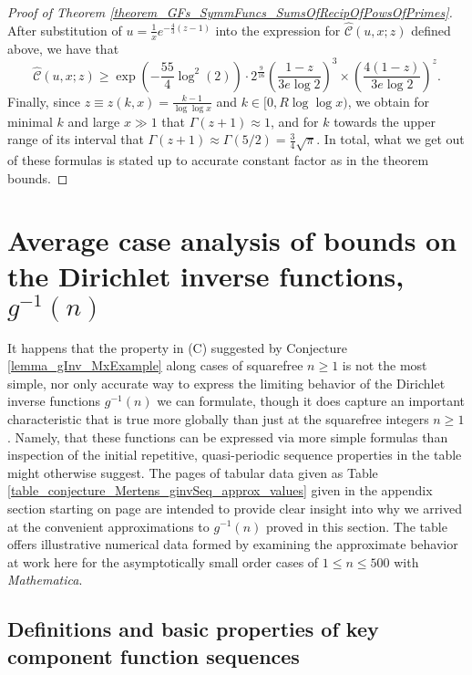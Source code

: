 \documentclass[11pt,reqno,a4letter]{article}
\numberwithin{figure}{section}
\numberwithin{table}{section}
\theoremstyle{plain}
\numberwithin{theorem}{section}
\theoremstyle{definition}
\begin{document}
\begin{proof}[Proof of Theorem \ref{theorem_GFs_SymmFuncs_SumsOfRecipOfPowsOfPrimes}]
After substitution of $u = \frac{1}{x} e^{-\frac{4}{3}(z-1)}$ into the expression for 
$\widehat{\mathcal{C}}(u, x; z)$ defined above, we have that 
\[
\widehat{\mathcal{C}}(u, x; z) \geq \exp\left(-\frac{55}{4} \log^2(2)\right) \cdot 2^{\frac{9}{16}} 
     \left(\frac{1-z}{3e\log 2}\right)^3 \times \left(\frac{4(1-z)}{3e\log 2}\right)^z. 
\]
Finally, since $z \equiv z(k, x) = \frac{k-1}{\log\log x}$ and $k \in [0, R\log\log x)$, we obtain 
for minimal $k$ and large $x \gg 1$ that $\Gamma(z+1) \approx 1$, and for $k$ towards the upper range of 
its interval that $\Gamma(z+1) \approx \Gamma(5/2) = \frac{3}{4} \sqrt{\pi}$. 
In total, what we get out of these formulas is stated up to accurate 
constant factor as in the theorem bounds. 
\end{proof} 

\newpage
\section{Average case analysis of bounds on the Dirichlet inverse functions, $g^{-1}(n)$} 
\label{Section_InvFunc_PreciseExpsAndAsymptotics} 

It happens that the property in (C) suggested by 
Conjecture \ref{lemma_gInv_MxExample} along cases of squarefree $n \geq 1$ is not the most 
simple, nor only accurate way to express the limiting behavior of the 
Dirichlet inverse functions $g^{-1}(n)$ we can formulate, 
though it does capture an important characteristic that is true more globally than just at the 
squarefree integers $n \geq 1$. Namely, that these 
functions can be expressed via more simple formulas than inspection of the initial 
repetitive, quasi-periodic sequence properties in the table might otherwise suggest. 
The pages of tabular data given as Table \ref{table_conjecture_Mertens_ginvSeq_approx_values} 
given in the appendix section starting on 
page \pageref{table_conjecture_Mertens_ginvSeq_approx_values} are intended to 
provide clear insight into why we arrived at the convenient approximations to 
$g^{-1}(n)$ proved in this section. The table offers illustrative 
numerical data formed by examining the approximate behavior 
at work here for the asymptotically 
small order cases of $1 \leq n \leq 500$ with \emph{Mathematica}. 

\subsection{Definitions and basic properties of key component function sequences} 
\end{document}
